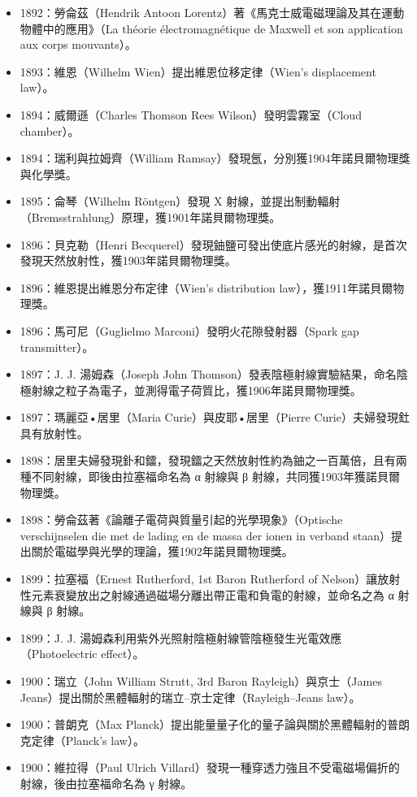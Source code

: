 \documentclass[a4paper,12pt]{article}
\begin{document}
\begin{itemize}
\item 1892：勞侖茲（Hendrik Antoon Lorentz）著《馬克士威電磁理論及其在運動物體中的應用》（La théorie électromagnétique de Maxwell et son application aux corps mouvants）。
\item 1893：維恩（Wilhelm Wien）提出維恩位移定律（Wien's displacement law）。
\item 1894：威爾遜（Charles Thomson Rees Wilson）發明雲霧室（Cloud chamber）。
\item 1894：瑞利與拉姆齊（William Ramsay）發現氬，分別獲1904年諾貝爾物理獎與化學獎。
\item 1895：侖琴（Wilhelm Röntgen）發現 X 射線，並提出制動輻射（Bremsstrahlung）原理，獲1901年諾貝爾物理獎。
\item 1896：貝克勒（Henri Becquerel）發現鈾鹽可發出使底片感光的射線，是首次發現天然放射性，獲1903年諾貝爾物理獎。
\item 1896：維恩提出維恩分布定律（Wien's distribution law），獲1911年諾貝爾物理獎。
\item 1896：馬可尼（Guglielmo Marconi）發明火花隙發射器（Spark gap transmitter）。
\item 1897：J. J. 湯姆森（Joseph John Thomson）發表陰極射線實驗結果，命名陰極射線之粒子為電子，並測得電子荷質比，獲1906年諾貝爾物理獎。
\item 1897：瑪麗亞•居里（Maria Curie）與皮耶•居里（Pierre Curie）夫婦發現釷具有放射性。
\item 1898：居里夫婦發現釙和鐳，發現鐳之天然放射性約為鈾之一百萬倍，且有兩種不同射線，即後由拉塞福命名為 α 射線與 β 射線，共同獲1903年獲諾貝爾物理獎。
\item 1898：勞侖茲著《論離子電荷與質量引起的光學現象》（Optische verschijnselen die met de lading en de massa der ionen in verband staan）提出關於電磁學與光學的理論，獲1902年諾貝爾物理獎。
\item 1899：拉塞福（Ernest Rutherford, 1st Baron Rutherford of Nelson）讓放射性元素衰變放出之射線通過磁場分離出帶正電和負電的射線，並命名之為 α 射線與 β 射線。
\item 1899：J. J. 湯姆森利用紫外光照射陰極射線管陰極發生光電效應（Photoelectric effect）。
\item 1900：瑞立（John William Strutt, 3rd Baron Rayleigh）與京士（James Jeans）提出關於黑體輻射的瑞立–京士定律（Rayleigh–Jeans law）。
\item 1900：普朗克（Max Planck）提出能量量子化的量子論與關於黑體輻射的普朗克定律（Planck's law）。
\item 1900：維拉得（Paul Ulrich Villard）發現一種穿透力強且不受電磁場偏折的射線，後由拉塞福命名為 γ 射線。

\end{itemize}
\end{document}
